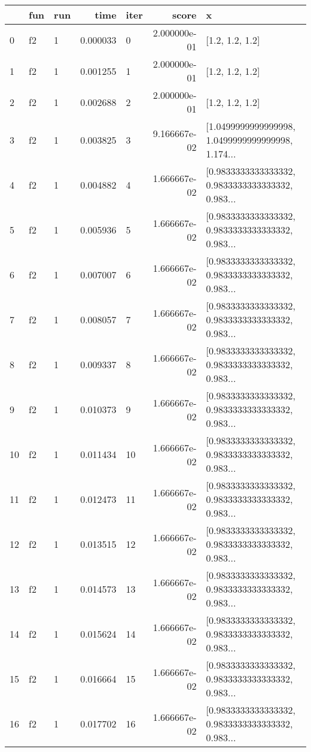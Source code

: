 \begin{tabular}{lllrlrl}
\toprule
{} & fun & run &      time & iter &         score &                                                  x \\
\midrule
0   &  f2 &   1 &  0.000033 &    0 &  2.000000e-01 &                                    [1.2, 1.2, 1.2] \\
1   &  f2 &   1 &  0.001255 &    1 &  2.000000e-01 &                                    [1.2, 1.2, 1.2] \\
2   &  f2 &   1 &  0.002688 &    2 &  2.000000e-01 &                                    [1.2, 1.2, 1.2] \\
3   &  f2 &   1 &  0.003825 &    3 &  9.166667e-02 &  [1.0499999999999998, 1.0499999999999998, 1.174... \\
4   &  f2 &   1 &  0.004882 &    4 &  1.666667e-02 &  [0.9833333333333332, 0.9833333333333332, 0.983... \\
5   &  f2 &   1 &  0.005936 &    5 &  1.666667e-02 &  [0.9833333333333332, 0.9833333333333332, 0.983... \\
6   &  f2 &   1 &  0.007007 &    6 &  1.666667e-02 &  [0.9833333333333332, 0.9833333333333332, 0.983... \\
7   &  f2 &   1 &  0.008057 &    7 &  1.666667e-02 &  [0.9833333333333332, 0.9833333333333332, 0.983... \\
8   &  f2 &   1 &  0.009337 &    8 &  1.666667e-02 &  [0.9833333333333332, 0.9833333333333332, 0.983... \\
9   &  f2 &   1 &  0.010373 &    9 &  1.666667e-02 &  [0.9833333333333332, 0.9833333333333332, 0.983... \\
10  &  f2 &   1 &  0.011434 &   10 &  1.666667e-02 &  [0.9833333333333332, 0.9833333333333332, 0.983... \\
11  &  f2 &   1 &  0.012473 &   11 &  1.666667e-02 &  [0.9833333333333332, 0.9833333333333332, 0.983... \\
12  &  f2 &   1 &  0.013515 &   12 &  1.666667e-02 &  [0.9833333333333332, 0.9833333333333332, 0.983... \\
13  &  f2 &   1 &  0.014573 &   13 &  1.666667e-02 &  [0.9833333333333332, 0.9833333333333332, 0.983... \\
14  &  f2 &   1 &  0.015624 &   14 &  1.666667e-02 &  [0.9833333333333332, 0.9833333333333332, 0.983... \\
15  &  f2 &   1 &  0.016664 &   15 &  1.666667e-02 &  [0.9833333333333332, 0.9833333333333332, 0.983... \\
16  &  f2 &   1 &  0.017702 &   16 &  1.666667e-02 &  [0.9833333333333332, 0.9833333333333332, 0.983... \\

\end{tabular}
